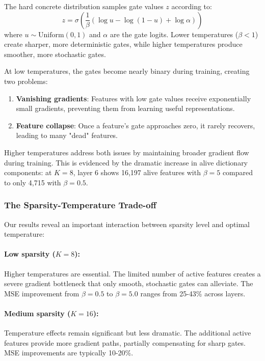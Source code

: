 The hard concrete distribution samples gate values $z$ according to:
\begin{equation}
z = \sigma\left(\frac{1}{\beta}(\log u - \log(1-u) + \log \alpha)\right)
\end{equation}
where $u \sim \text{Uniform}(0,1)$ and $\alpha$ are the gate logits. Lower temperatures ($\beta < 1$) create sharper, more deterministic gates, while higher temperatures produce smoother, more stochastic gates.

At low temperatures, the gates become nearly binary during training, creating two problems:
\begin{enumerate}
    \item \textbf{Vanishing gradients}: Features with low gate values receive exponentially small gradients, preventing them from learning useful representations.
    \item \textbf{Feature collapse}: Once a feature's gate approaches zero, it rarely recovers, leading to many "dead" features.
\end{enumerate}

Higher temperatures address both issues by maintaining broader gradient flow during training. This is evidenced by the dramatic increase in alive dictionary components: at $K=8$, layer 6 shows 16,197 alive features with $\beta=5$ compared to only 4,715 with $\beta=0.5$.

\subsubsection{The Sparsity-Temperature Trade-off}

Our results reveal an important interaction between sparsity level and optimal temperature:

\paragraph{Low sparsity ($K=8$):} Higher temperatures are essential. The limited number of active features creates a severe gradient bottleneck that only smooth, stochastic gates can alleviate. The MSE improvement from $\beta=0.5$ to $\beta=5.0$ ranges from 25-43\% across layers.

\paragraph{Medium sparsity ($K=16$):} Temperature effects remain significant but less dramatic. The additional active features provide more gradient paths, partially compensating for sharp gates. MSE improvements are typically 10-20\%.

